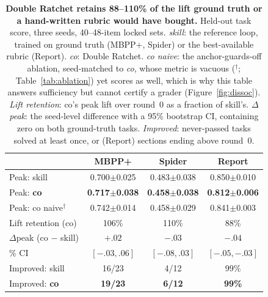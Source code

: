 \documentclass[letterpaper]{article} %
\begin{document}
\begin{table}[t]
\centering
\footnotesize
\setlength{\tabcolsep}{3pt}
\begin{tabular}{lccc}
\toprule
 & MBPP+ & Spider & Report \\
\midrule
Peak: skill & 0.700$\pm$0.025 & 0.483$\pm$0.038 & 0.850$\pm$0.010 \\
Peak: \textbf{co} & \textbf{0.717$\pm$0.038} & \textbf{0.458$\pm$0.038} & \textbf{0.812$\pm$0.006} \\
Peak: co naive$^\dagger$ & 0.742$\pm$0.014 & 0.458$\pm$0.029 & 0.841$\pm$0.003 \\
\midrule
Lift retention (co) & 106\% & 110\% & 88\% \\
$\Delta$peak (co $-$ skill) & $+.02$ & $-.03$ & $-.04$ \\
\quad 95\% CI & $[-.03,.06]$ & $[-.08,.03]$ & $[-.05,-.03]$ \\
\midrule
Improved: skill & 16/23 & 4/12 & 99\% \\
Improved: \textbf{co} & \textbf{19/23} & \textbf{6/12} & \textbf{99\%} \\
\bottomrule
\end{tabular}
\caption{\textbf{Double Ratchet retains 88--110\% of the lift ground truth or a hand-written rubric would have bought.} Held-out task score, three seeds, 40--48-item locked sets. \emph{skill}: the reference loop, trained on ground truth (MBPP+, Spider) or the best-available rubric (Report). \emph{co}: Double Ratchet. \emph{co naive}: the anchor-guards-off ablation, seed-matched to \emph{co}, whose metric is vacuous ($^\dagger$; Table~\ref{tab:ablation}) yet scores as well, which is why this table answers sufficiency but cannot certify a grader (Figure~\ref{fig:dissoc}). \emph{Lift retention}: co's peak lift over round~0 as a fraction of skill's. \emph{$\Delta$peak}: the seed-level difference with a 95\% bootstrap CI, containing zero on both ground-truth tasks. \emph{Improved}: never-passed tasks solved at least once, or (Report) sections ending above round~0.}
\label{tab:main}
\end{table}
\end{document}
